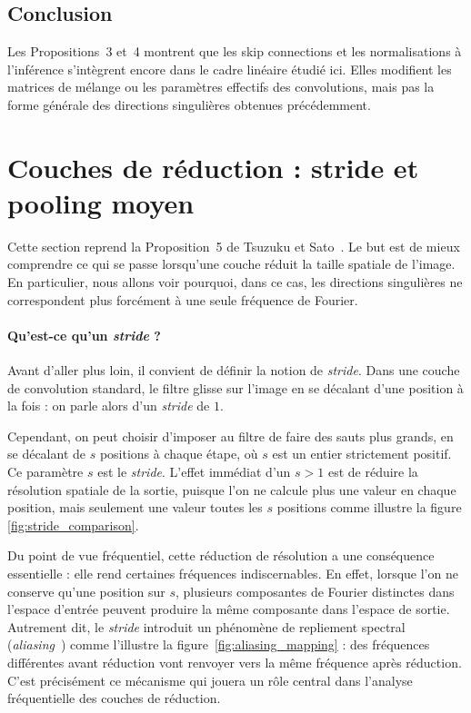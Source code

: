 \subsection{Conclusion}

Les Propositions~3 et~4 montrent que les skip connections et les normalisations à l'inférence
s'intègrent encore dans le cadre linéaire étudié ici. Elles modifient les matrices de mélange ou les
paramètres effectifs des convolutions, mais pas la forme générale des directions singulières obtenues
précédemment.

\section{Couches de réduction : stride et pooling moyen}
\label{sec:couches-reduction-stride-pooling}

Cette section reprend la Proposition~5 de Tsuzuku et Sato~\cite{tsuzuku2019structural}. Le but est de mieux comprendre
ce qui se passe lorsqu'une couche réduit la taille spatiale de l'image. En particulier, nous allons voir
pourquoi, dans ce cas, les directions singulières ne correspondent plus forcément à une seule
fréquence de Fourier.

\paragraph{Qu'est-ce qu'un \textit{stride} ?}

Avant d'aller plus loin, il convient de définir la notion de \textit{stride}. 
Dans une couche de convolution standard, le filtre glisse sur l'image en se décalant d'une position à la fois :
on parle alors d'un \textit{stride} de $1$.

Cependant, on peut choisir d'imposer au filtre de faire des sauts plus grands, en se décalant de $s$ positions à 
chaque étape, où $s$ est un entier strictement positif. Ce paramètre $s$ est le \textit{stride}.
L'effet immédiat d'un $s > 1$ est de réduire la résolution spatiale de la sortie, puisque l'on ne calcule plus
une valeur en chaque position, mais seulement une valeur toutes les $s$ positions comme illustre la figure \ref{fig:stride_comparison}.

Du point de vue fréquentiel, cette réduction de résolution a une conséquence essentielle :
elle rend certaines fréquences indiscernables. En effet, lorsque l'on ne conserve qu'une position sur $s$,
plusieurs composantes de Fourier distinctes dans l'espace d'entrée peuvent produire la même composante
dans l'espace de sortie. Autrement dit, le \textit{stride} introduit un phénomène de repliement spectral
(\textit{aliasing}~\cite{gonzalez2008digital}) comme l'illustre la figure~\ref{fig:aliasing_mapping} : des 
fréquences différentes avant réduction vont renvoyer vers la même fréquence après réduction.
C'est précisément ce mécanisme qui jouera un rôle central dans l'analyse fréquentielle des couches de réduction.

